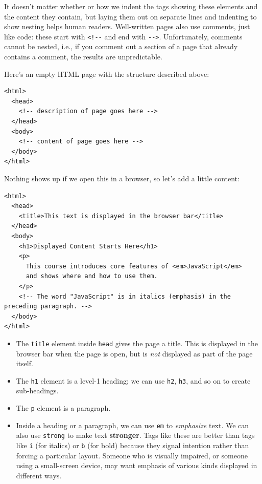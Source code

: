 It doesn't matter whether or how we indent the tags showing these
elements and the content they contain, but laying them out on separate
lines and indenting to show nesting helps human readers. Well-written
pages also use comments, just like code: these start with
\texttt{\textless{}!-\/-} and end with \texttt{-\/-\textgreater{}}.
Unfortunately, comments cannot be nested, i.e., if you comment out a
section of a page that already contains a comment, the results are
unpredictable.

Here's an empty HTML page with the structure described above:

\begin{verbatim}
<html>
  <head>
    <!-- description of page goes here -->
  </head>
  <body>
    <!-- content of page goes here -->
  </body>
</html>
\end{verbatim}

Nothing shows up if we open this in a browser, so let's add a little
content:

\begin{verbatim}
<html>
  <head>
    <title>This text is displayed in the browser bar</title>
  </head>
  <body>
    <h1>Displayed Content Starts Here</h1>
    <p>
      This course introduces core features of <em>JavaScript</em>
      and shows where and how to use them.
    </p>
    <!-- The word "JavaScript" is in italics (emphasis) in the preceding paragraph. -->
  </body>
</html>
\end{verbatim}

\begin{itemize}
\tightlist
\item
  The \texttt{title} element inside \texttt{head} gives the page a
  title. This is displayed in the browser bar when the page is open, but
  is \emph{not} displayed as part of the page itself.
\item
  The \texttt{h1} element is a level-1 heading; we can use \texttt{h2},
  \texttt{h3}, and so on to create sub-headings.
\item
  The \texttt{p} element is a paragraph.
\item
  Inside a heading or a paragraph, we can use \texttt{em} to
  \emph{emphasize} text. We can also use \texttt{strong} to make text
  \textbf{stronger}. Tags like these are better than tags like
  \texttt{i} (for italics) or \texttt{b} (for bold) because they signal
  intention rather than forcing a particular layout. Someone who is
  visually impaired, or someone using a small-screen device, may want
  emphasis of various kinds displayed in different ways.
\end{itemize}

